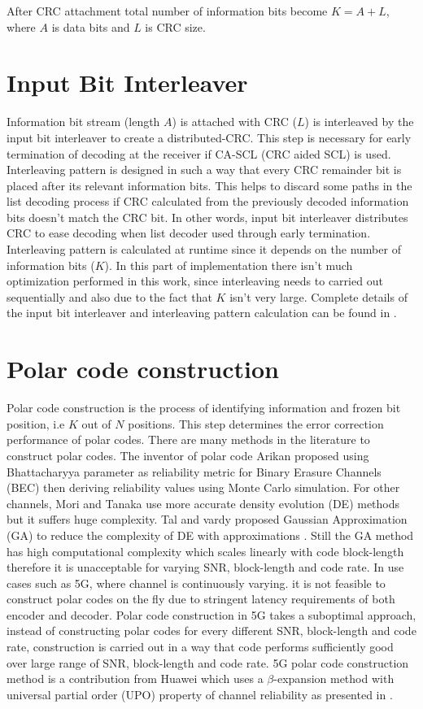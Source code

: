 After CRC attachment total number of information bits become $K = A + L$, where $ A $ is data bits and $ L $ is CRC size.

\section{Input Bit Interleaver}
Information bit stream (length $A$) is attached with CRC ($L$) is interleaved by the input bit interleaver to create a distributed-CRC. This step is necessary for early termination of decoding at the receiver if CA-SCL (CRC aided SCL) is used. Interleaving pattern is designed in such a way that every CRC remainder bit is placed after its relevant information bits. This helps to discard some paths in the list decoding process if CRC calculated from the previously decoded information bits doesn't match the CRC bit. In other words, input bit interleaver distributes CRC to ease decoding when list decoder used through early termination. Interleaving pattern is calculated at runtime since it depends on the number of information bits ($K$). In this part of implementation there isn't much optimization performed in this work, since interleaving needs to carried out sequentially and also due to the fact that $K$ isn't very large. Complete details of the input bit interleaver and interleaving pattern calculation can be found in \cite{3gpp.38.212}.

\section{Polar code construction}
Polar code construction is the process of identifying information and frozen bit position, i.e $K$ out of $N$ positions. This step determines the error correction performance of polar codes. There are many methods in the literature to construct polar codes. The inventor of polar code Arikan \cite{Arikan} proposed using Bhattacharyya parameter as reliability metric for Binary Erasure Channels (BEC) then deriving reliability values using Monte Carlo simulation. For other channels, Mori and Tanaka \cite{MoriTanakaDE} use more accurate density evolution (DE) methods but it suffers huge complexity. Tal and vardy proposed Gaussian Approximation (GA) to reduce the complexity of DE with approximations \cite{TalVardyGA}. Still the GA method has high computational complexity which scales linearly with code block-length therefore it is unacceptable for varying SNR, block-length and code rate. In use cases such as 5G, where channel is continuously varying. it is not feasible to construct polar codes on the fly due to stringent latency requirements of both encoder and decoder. Polar code construction in 5G takes a suboptimal approach, instead of constructing polar codes for every different SNR, block-length and code rate, construction is carried out in a way that code performs sufficiently good over large range of SNR, block-length and code rate. 5G polar code construction method is a contribution from Huawei which uses a $\beta$-expansion method with universal partial order (UPO) property of channel reliability as presented in \cite{betaExpansion}. \newline

